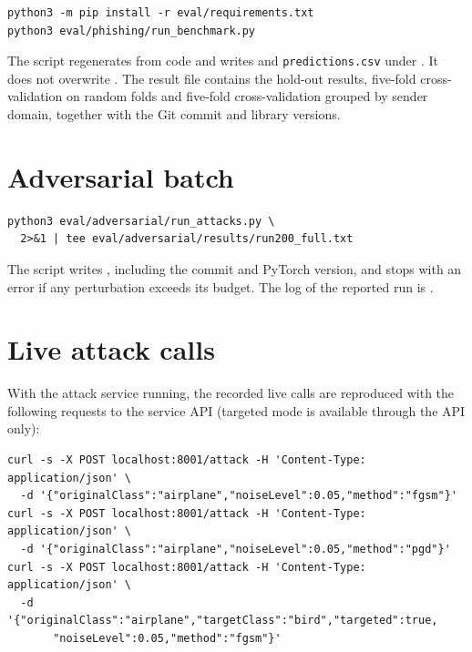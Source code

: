 \begin{lstlisting}
python3 -m pip install -r eval/requirements.txt
python3 eval/phishing/run_benchmark.py
\end{lstlisting}

The script regenerates  from code and writes  and \texttt{predictions.csv} under . It does not overwrite . The result file contains the hold-out results, five-fold cross-validation on random folds and five-fold cross-validation grouped by sender domain, together with the Git commit and library versions.

\section{Adversarial batch}
\label{sec:run-adv}

\begin{lstlisting}
python3 eval/adversarial/run_attacks.py \
  2>&1 | tee eval/adversarial/results/run200_full.txt
\end{lstlisting}

The script writes , including the commit and PyTorch version, and stops with an error if any perturbation exceeds its budget. The log of the reported run is .

\section{Live attack calls}
\label{sec:run-live}

With the attack service running, the recorded live calls are reproduced with the following requests to the service API (targeted mode is available through the API only):

\begin{lstlisting}
curl -s -X POST localhost:8001/attack -H 'Content-Type: application/json' \
  -d '{"originalClass":"airplane","noiseLevel":0.05,"method":"fgsm"}'
curl -s -X POST localhost:8001/attack -H 'Content-Type: application/json' \
  -d '{"originalClass":"airplane","noiseLevel":0.05,"method":"pgd"}'
curl -s -X POST localhost:8001/attack -H 'Content-Type: application/json' \
  -d '{"originalClass":"airplane","targetClass":"bird","targeted":true,
       "noiseLevel":0.05,"method":"fgsm"}'
\end{lstlisting}
